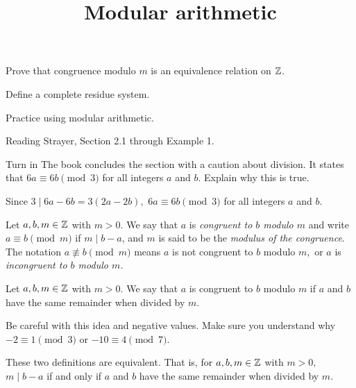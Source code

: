 \documentclass{../ximera}
\title{Modular arithmetic}
\begin{document}
\begin{abstract}
\end{abstract}
\maketitle

\begin{obj}
\item Prove that congruence modulo $m$ is an equivalence relation on $\mathbb Z$.
\item Define a complete residue system.
\item Practice using modular arithmetic.
\end{obj}

\begin{pre}
    \item[Reading] Strayer, Section 2.1 through Example 1.
    \item[Turn in] The book concludes the section with a caution about division. It states that $6a\equiv 6b \pmod 3$ for all integers $a$ and $b$. Explain why this is true.
    
    
    \begin{solution}
        Since $3\mid 6a-6b=3(2a-2b),$ $6a\equiv 6b \pmod 3$ for all integers $a$ and $b$.
    \end{solution}
    \end{pre}




\begin{defn}\label{defn:mod-divides} Let $a,b,m\in\mathbb Z$ with $m>0.$
We say that $a$ is \emph{congruent to $b$ modulo $m$} and write $a \equiv b \pmod{m}$ if $m\mid b-a$, and $m$ is said to be the \emph{modulus of the congruence}. The notation $a\not\equiv b\pmod m$ means $a$ is not congruent to $b$ modulo $m,$ or $a$ is \emph{incongruent to $b$ modulo $m$.} 
\end{defn}

\begin{defn}\label{defn:mod-remainder} Let $a,b,m\in\mathbb Z$ with $m>0.$ We say that $a$ is congruent to $b$ modulo $m$ if $a$ and $b$ have the same remainder when divided by $m$. 
\end{defn}
Be careful with this idea and negative values. Make sure you understand why $-2\equiv 1\pmod{3}$ or $-10\equiv 4\pmod{7}$.

\begin{proposition}\label{prop:mod-defn:equiv}
These two definitions are equivalent. That is, for $a,b,m\in\mathbb Z$ with $m>0,$ $m\mid b-a$ if and only if $a$ and $b$ have the same remainder when divided by $m$.
\end{proposition}
\end{document}
